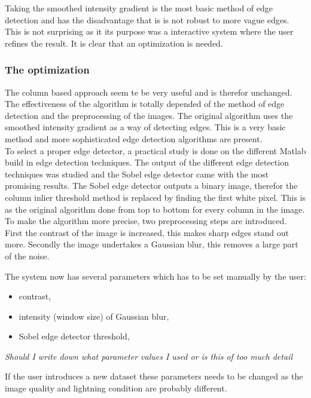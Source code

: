 \documentclass[10pt]{article}
\begin{document}
Taking the smoothed intensity gradient is the most basic method of edge
detection and has the disadvantage that is is not robust to more vague
edges. This is not surprising as it its purpose was a interactive system where the
user refines the result. It is clear that an optimization is needed.

  \subsubsection{The optimization}
The column based approach seem te be very useful and is therefor unchanged. 
The effectiveness of the algorithm is totally depended of the method of edge
detection and the preprocessing of the images. 
The original algorithm uses the smoothed intensity gradient as a way of
detecting edges. This is a very basic method and more sophisticated edge
detection algorithms are present.\\
To select a proper edge detector, a practical study is done on the different
Matlab build in edge detection techniques. The output of the different edge
detection techniques was studied and the Sobel edge detector came with the most
promising results. The Sobel edge detector outputs a binary image, therefor the column inlier
threshold method is replaced by finding the first white pixel. This is as the
original algorithm done from top to bottom for every column in the image.
\\ 
To make the algorithm more precise, two preprocessing
steps are introduced. First the contrast of the image is increased, this makes
sharp edges stand out more.  Secondly the image undertakes a Gaussian blur,
this removes a large part of the noise.

The system now has several parameters which has to be set manually by the user:
\begin{itemize}
	\item contrast,
	\item intensity (window size) of Gaussian blur,
	\item Sobel edge detector threshold,
\end{itemize}
\textit{Should I write down what parameter values I used or is this of too much
detail}

If the user introduces a new dataset these parameters needs to be changed
as the image quality and lightning condition are probably different.
\end{document}
